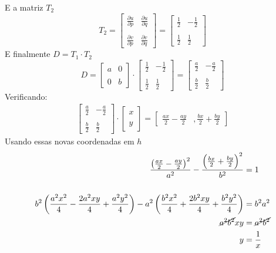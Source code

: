 \documentclass[12pt,letterpaper]{article}
\begin{document}
E a matriz \(T_2\)
\[
T_2 =
\begin{bmatrix}
  \frac{\partial u}{\partial p} & \frac{\partial u}{\partial q }\\ \\
  \frac{\partial v}{\partial p} & \frac{\partial v}{\partial q }
\end{bmatrix} = \begin{bmatrix}
  \frac{1}{2} & -\frac{1}{2}
  \\ \\
  \frac{1}{2} & \frac{1}{2}
\end{bmatrix}
\]
E finalmente \(D = T_1 \cdot T_2\)
\[
D =
\begin{bmatrix}
  a & 0\\ \\
  0 & b
\end{bmatrix} \cdot
\begin{bmatrix}
 \frac{1}{2} & -\frac{1}{2}
 \\ \\
 \frac{1}{2} & \frac{1}{2}
\end{bmatrix}
= \begin{bmatrix}
 \frac{a}{2} & -\frac{a}{2}
 \\ \\
 \frac{b}{2} & \frac{b}{2}
\end{bmatrix}
\]
Verificando:
\begin{align*}
  \begin{bmatrix}
   \frac{a}{2} & -\frac{a}{2}
   \\ \\
   \frac{b}{2} & \frac{b}{2}
 \end{bmatrix} \cdot
 \begin{bmatrix}
 x \\
 \\
 y
 \end{bmatrix} =
 \begin{bmatrix}
 \frac{ax}{2} - \frac{ay}{2} &,  \frac{bx}{2} + \frac{by}{2}
 \end{bmatrix}
\end{align*}
Usando essas novas coordenadas em \(h\)
\begin{align*}
  \frac{\left(\frac{ax}{2} - \frac{ay}{2}\right)^2}{a^2} - \frac{\left(\frac{bx}{2} + \frac{by}{2}\right)^2}{b^2} &= 1\\ \\
  b^2 \left(\frac{a^2x^2}{4} - \frac{2a^2xy}{4} + \frac{a^2 y^2}{4}\right) - a^2\left( \frac{b^2x^2}{4} + \frac{2b^2xy}{4} + \frac{b^2 y^2}{4} \right) &= b^2a^2\\
  \cancel{a^2b^2} xy &= \cancel{a^2b^2}\\
  y &= \frac{1}{x}
\end{align*}
\newpage
\end{document}
